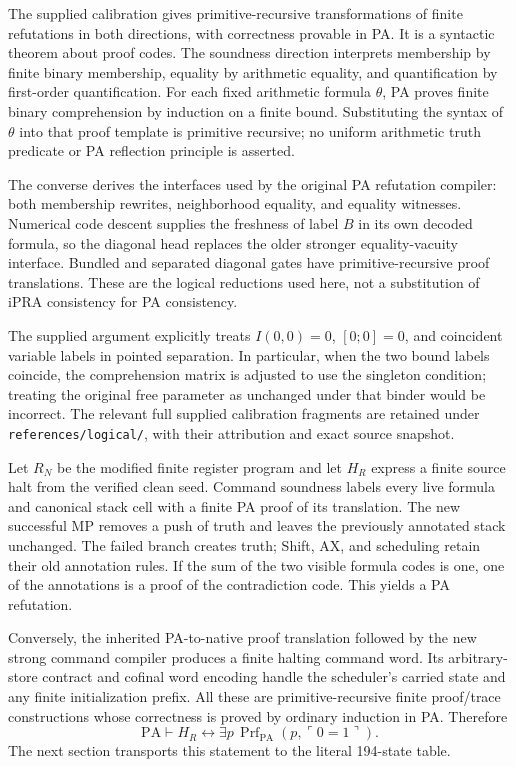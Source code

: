 \documentclass[11pt,letterpaper]{article}
\newcommand{\PA}{\mathrm{PA}}
\newcommand{\Prf}{\operatorname{Prf}}
\newcommand{\file}[1]{\texttt{\nolinkurl{#1}}}
\begin{document}
The supplied calibration gives primitive-recursive transformations of
finite refutations in both directions, with correctness provable in PA.
It is a syntactic theorem about proof codes. The soundness direction
interprets membership by finite binary membership, equality by arithmetic
equality, and quantification by first-order quantification. For each fixed
arithmetic formula $\theta$, PA proves finite binary comprehension by
induction on a finite bound. Substituting the syntax of $\theta$ into that
proof template is primitive recursive; no uniform arithmetic truth
predicate or PA reflection principle is asserted.

The converse derives the interfaces used by the original PA refutation
compiler: both membership rewrites, neighborhood equality, and equality
witnesses. Numerical code descent supplies the freshness of label $B$
in its own decoded formula, so the diagonal head replaces the older
stronger equality-vacuity interface. Bundled and separated diagonal gates
have primitive-recursive proof translations. These are the logical
reductions used here, not a substitution of iPRA consistency for PA
consistency.

The supplied argument explicitly treats $I(0,0)=0$, $[0;0]=0$, and
coincident variable labels in pointed separation. In particular, when
the two bound labels coincide, the comprehension matrix is adjusted to
use the singleton condition; treating the original free parameter as
unchanged under that binder would be incorrect. The relevant full supplied
calibration fragments are retained under \file{references/logical/},
with their attribution and exact source snapshot.

Let $R_N$ be the modified finite register program and let $H_R$ express a
finite source halt from the verified clean seed. Command soundness labels
every live formula and canonical stack cell with a finite PA proof of its
translation. The new successful MP removes a push of truth and leaves
the previously annotated stack unchanged. The failed branch creates truth;
Shift, AX, and scheduling retain their old annotation rules. If the sum
of the two visible formula codes is one, one of the annotations is a
proof of the contradiction code. This yields a PA refutation.

Conversely, the inherited PA-to-native proof translation followed by the
new strong command compiler produces a finite halting command word.
Its arbitrary-store contract and cofinal word encoding handle the
scheduler's carried state and any finite initialization prefix. All these
are primitive-recursive finite proof/trace constructions whose correctness
is proved by ordinary induction in PA. Therefore
\[
 \PA\vdash H_R\leftrightarrow
       \exists p\,\Prf_{\PA}(p,\ulcorner0=1\urcorner).
\]
The next section transports this statement to the literal 194-state table.
\end{document}
